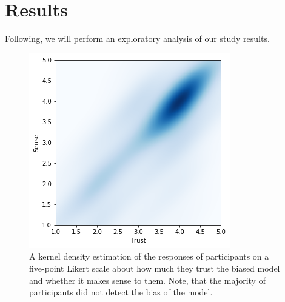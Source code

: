 \section{Results}
\label{sec:results}
Following, we will perform an exploratory analysis of our study results.

\begin{figure}
\centering
\includegraphics[width=0.45\linewidth]{aggexplain/stats/tvss}%
\caption[Trust and whether the model makes sense.]{
A kernel density estimation of the responses of participants on a five-point Likert scale
about how much they trust the biased model and whether it makes sense to them.
Note, that the majority of participants did not detect the bias of the model.
}
\label{figs:tvss}
\vspace*{-0.5em}
\end{figure}

